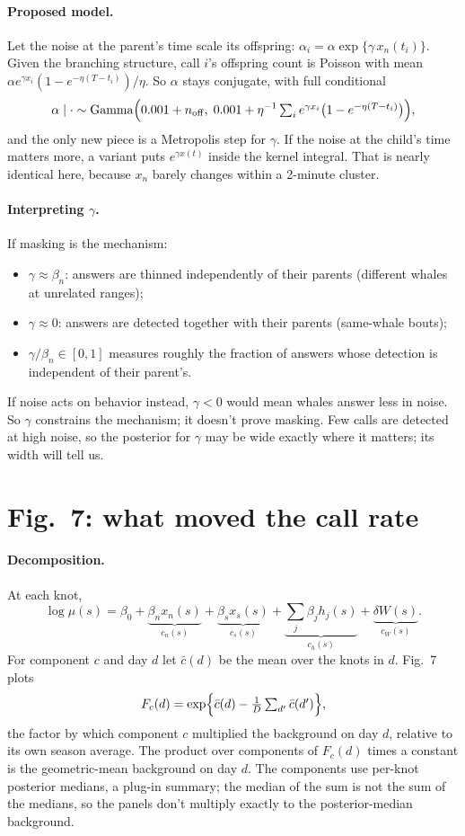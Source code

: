 \documentclass[11pt]{article}
\begin{document}
\paragraph{Proposed model.}
Let the noise at the parent's time scale its offspring:
$\alpha_i=\alpha\exp\{\gamma\,x_n(t_i)\}$. Given the branching structure,
call $i$'s offspring count is Poisson with mean
$\alpha e^{\gamma x_i}(1-e^{-\eta(T-t_i)})/\eta$. So $\alpha$ stays conjugate,
with full conditional
\[
\alpha\mid\cdot\sim\mathrm{Gamma}\Bigl(0.001+n_{\rm off},\;
0.001+\eta^{-1}\textstyle\sum_i e^{\gamma x_i}\bigl(1-e^{-\eta(T-t_i)}\bigr)\Bigr),
\]
and the only new piece is a Metropolis step for $\gamma$. If the noise at the
child's time matters more, a variant puts $e^{\gamma x(t)}$ inside the kernel
integral. That is nearly identical here, because $x_n$ barely changes within a
2-minute cluster.

\paragraph{Interpreting $\gamma$.}
If masking is the mechanism:
\begin{itemize}
\item $\gamma\approx\beta_n$: answers are thinned independently of their
  parents (different whales at unrelated ranges);
\item $\gamma\approx0$: answers are detected together with their parents
  (same-whale bouts);
\item $\gamma/\beta_n\in[0,1]$ measures roughly the fraction of answers whose
  detection is independent of their parent's.
\end{itemize}
If noise acts on behavior instead, $\gamma<0$ would mean whales answer less in
noise. So $\gamma$ constrains the mechanism; it doesn't prove masking. Few calls
are detected at high noise, so the posterior for $\gamma$ may be wide exactly
where it matters; its width will tell us.

\section{Fig.~7: what moved the call rate}\label{sec:fig7}

\paragraph{Decomposition.}
At each knot,
\[
\log\mu(s)=\beta_0+\underbrace{\beta_n x_n(s)}_{c_n(s)}+\underbrace{\beta_s x_s(s)}_{c_s(s)}
+\underbrace{\textstyle\sum_j\beta_j h_j(s)}_{c_h(s)}+\underbrace{\delta W(s)}_{c_W(s)}.
\]
For component $c$ and day $d$ let $\bar c(d)$ be the mean over the knots in
$d$. Fig.~7 plots
\[
F_c(d)=\exp\Bigl\{\bar c(d)-\tfrac{1}{D}\textstyle\sum_{d'}\bar c(d')\Bigr\},
\]
the factor by which component $c$ multiplied the background on day $d$,
relative to its own season average. The product over components of $F_c(d)$
times a constant is the geometric-mean background on day $d$. The
components use per-knot posterior medians, a plug-in summary; the median of
the sum is not the sum of the medians, so the panels don't multiply exactly
to the posterior-median background.
\end{document}
